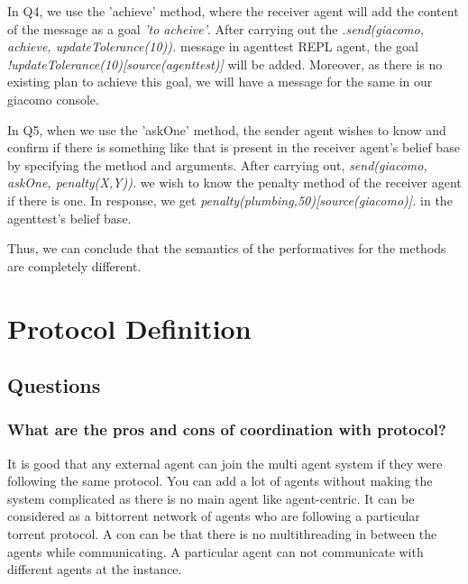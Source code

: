 \documentclass[]{article}
\begin{document}
In Q4, we use the 'achieve' method, where the receiver agent will add the content of the message as a goal \emph{'to acheive'}.
After carrying out the \emph{.send(giacomo, achieve, updateTolerance(10)).} message in agenttest REPL agent, the goal
\emph{!updateTolerance(10)[source(agenttest)]} will be added. Moreover, as there is no existing plan to achieve this goal, 
we will have a message for the same in our giacomo console.

In Q5, when we use the 'askOne' method, the sender agent wishes to know and confirm if there is something like that is present
in the receiver agent's belief base by specifying the method and arguments. After carrying out, \emph{send(giacomo, askOne, penalty(X,Y)).} we 
wish to know the penalty method of the receiver agent if there is one. In response, we get \emph{penalty(plumbing,50)[source(giacomo)].}
in the agenttest's belief base.

Thus, we can conclude that the semantics of the performatives for the methods are completely different.
\section{Protocol Definition}

\subsection{Questions}
\subsubsection{What are the pros and cons of coordination with protocol?}
It is good that any external agent can join the multi agent system if they were
following the same protocol. You can add a lot of agents without making the system complicated as there is no main agent like agent-centric. 
It can be considered as a bittorrent network of agents who are following a particular torrent protocol. A con can be that there is no multithreading 
in between the agents while communicating. A particular agent can not communicate with different agents at the instance.
\end{document}
